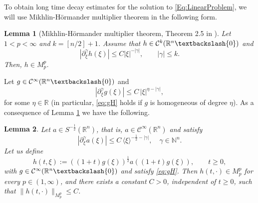 \documentclass[10pt]{article}
\newtheorem{lemma}{Lemma}[section]
\newcommand{\<}{\langle}
\renewcommand{\>}{\rangle}
\numberwithin{equation}{section}
\newcommand{\R}{{\mathbb{R}}}
\begin{document}
%
To obtain long time decay estimates for the solution to \eqref{Eq:LinearProblem}, we will use Mikhlin-H\"{o}rmander multiplier theorem in the following form.
\begin{lemma} [Mikhlin-H\"{o}rmander multiplier theorem, Theorem 2.5 in \cite{Hormander=1960}] \label{Thm:Mikhlin-Hormander}
Let $1<p<\infty$ and $k=[n/2]+1$. Assume that $h\in\mathcal{C}^k(\mathbb{R}^n\textbackslash\{0\})$ and
\[ |\partial_\xi^\gamma h(\xi)| \leq C|\xi|^{-|\gamma|}, \qquad |\gamma|\leq k. \]
Then, $h\in M_p^p$.
\end{lemma}
Let $g\in\mathcal{C}^\infty(\mathbb{R}^n\textbackslash\{0\})$ and
\begin{equation}\label{eq:gH}
|\partial_\xi^\gamma g(\xi)|\leq C\,|\xi|^{\eta-|\gamma|},
\end{equation}
for some $\eta\in\R$ (in particular, \eqref{eq:gH} holds if $g$ is homogeneous of degree $\eta$).
As a consequence of Lemma \ref{Thm:Mikhlin-Hormander} we have the following.
\begin{lemma}\label{lemma:m1-for-Plate-BQ}
Let $a\in S^{-\frac12}(\mathbb{R}^n)$, that is, $a\in \mathcal{C}^\infty(\mathbb{R}^n)$ and satisfy
\[ |\partial_\xi^\gamma a(\xi)|\leq C\,\langle \xi\rangle^{-\frac12-|\gamma|}, \quad \gamma\in \mathbb{N}^n. \]
Let us define
\[ h(t, \xi):=((1+t)g(\xi))^{\frac12}a((1+t)g(\xi)), \qquad t\ge0,  \]
with $g\in\mathcal{C}^\infty(\mathbb{R}^n\textbackslash\{0\})$ and satisfy \eqref{eq:gH}. Then $h(t, \cdot)\in M_p^p$ for every $p\in(1,\infty)$, and there exists a constant $C>0$, independent of $t\ge0$, such that $\|h(t, \cdot)\|_{M_p^p}\leq C$.
\end{lemma}
\end{document}
